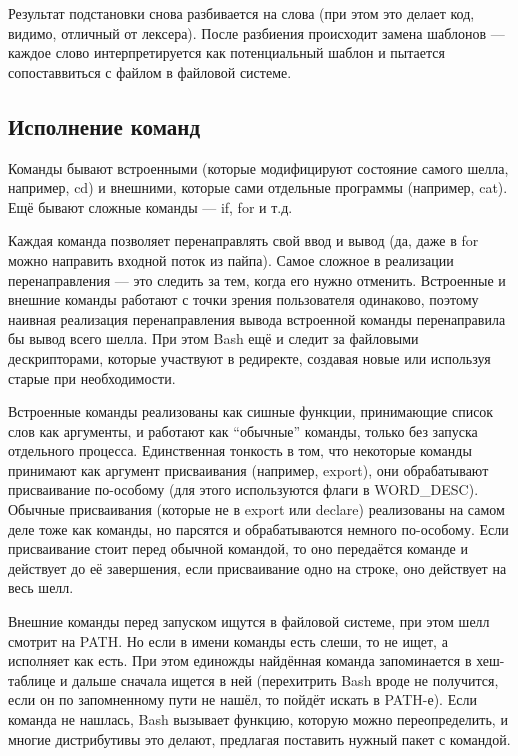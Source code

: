 \documentclass[a5paper]{article}
\begin{document}
Результат подстановки снова разбивается на слова (при этом это делает код, видимо, отличный от лексера). После разбиения происходит замена шаблонов --- каждое слово интерпретируется как потенциальный шаблон и пытается сопоставвиться с файлом в файловой системе.

\subsection{Исполнение команд}

Команды бывают встроенными (которые модифицируют состояние самого шелла, например, cd) и внешними, которые сами отдельные программы (например, cat). Ещё бывают сложные команды --- if, for и т.д.

Каждая команда позволяет перенаправлять свой ввод и вывод (да, даже в for можно направить входной поток из пайпа). Самое сложное в реализации перенаправления --- это следить за тем, когда его нужно отменить. Встроенные и внешние команды работают с точки зрения пользователя одинаково, поэтому наивная реализация перенаправления вывода встроенной команды перенаправила бы вывод всего шелла. При этом Bash ещё и следит за файловыми дескрипторами, которые участвуют в редиректе, создавая новые или используя старые при необходимости.

Встроенные команды реализованы как сишные функции, принимающие список слов как аргументы, и работают как ``обычные'' команды, только без запуска отдельного процесса. Единственная тонкость в том, что некоторые команды принимают как аргумент присваивания (например, export), они обрабатывают присваивание по-особому (для этого используются флаги в WORD\_DESC). Обычные присваивания (которые не в export или declare) реализованы на самом деле тоже как команды, но парсятся и обрабатываются немного по-особому. Если присваивание стоит перед обычной командой, то оно передаётся команде и действует до её завершения, если присваивание одно на строке, оно действует на весь шелл. 

Внешние команды перед запуском ищутся в файловой системе, при этом шелл смотрит на PATH. Но если в имени команды есть слеши, то не  ищет, а исполняет как есть. При этом единожды найдённая команда запоминается в хеш-таблице и дальше сначала ищется в ней (перехитрить Bash вроде не получится, если он по запомненному пути не нашёл, то пойдёт искать в PATH-е). Если команда не нашлась, Bash вызывает функцию, которую можно переопределить, и многие дистрибутивы это делают, предлагая поставить нужный пакет с командой.
\end{document}
